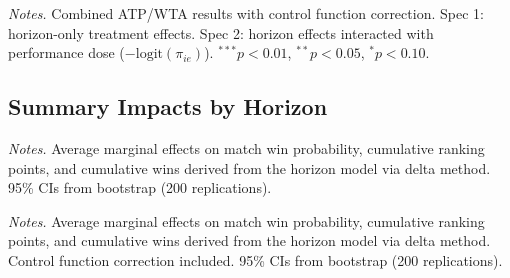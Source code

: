 \begin{table}[htbp]
\centering
\caption{Match-Level Horizon and Performance Dose Interaction: Non-Grand-Slam}
\label{tab:horizon_dose_nongs}
\begin{threeparttable}
\footnotesize

\begin{tablenotes}
\scriptsize
\item \textit{Notes.} Combined ATP/WTA results with control function correction. Spec 1: horizon-only treatment effects. Spec 2: horizon effects interacted with performance dose ($-\text{logit}(\pi_{ie})$). $^{***}p<0.01$, $^{**}p<0.05$, $^{*}p<0.10$.
\end{tablenotes}
\end{threeparttable}
\end{table}

\subsection{Summary Impacts by Horizon}
\label{app:summary_impacts}

\begin{table}[htbp]
\centering
\caption{Summary Match-Level Impacts by Horizon: Grand Slam}
\label{tab:summary_impacts_gs}
\begin{threeparttable}
\footnotesize

\begin{tablenotes}
\scriptsize
\item \textit{Notes.} Average marginal effects on match win probability, cumulative ranking points, and cumulative wins derived from the horizon model via delta method. 95\% CIs from bootstrap (200 replications).
\end{tablenotes}
\end{threeparttable}
\end{table}

\begin{table}[htbp]
\centering
\caption{Summary Match-Level Impacts by Horizon: Non-Grand-Slam}
\label{tab:summary_impacts_nongs}
\begin{threeparttable}
\footnotesize

\begin{tablenotes}
\scriptsize
\item \textit{Notes.} Average marginal effects on match win probability, cumulative ranking points, and cumulative wins derived from the horizon model via delta method. Control function correction included. 95\% CIs from bootstrap (200 replications).
\end{tablenotes}
\end{threeparttable}
\end{table}

